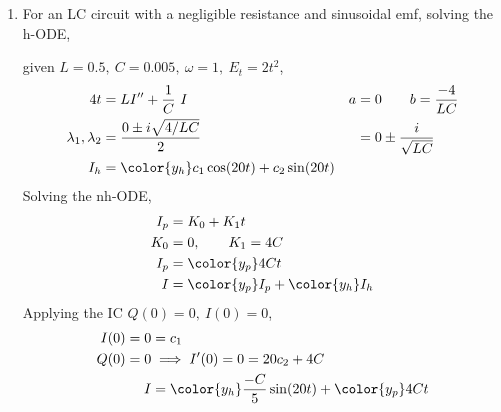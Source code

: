 \begin{enumerate}
    \item For an LC circuit with a negligible resistance and sinusoidal emf, solving
          the h-ODE, \par
          given $ L = 0.5,\ C = 0.005,\ \omega = 1,\ E_{t} = 2t^{2}$,
          \begin{align}
              4t                       & = LI'' + \frac{1}{C}\ I        &
              a                        & = 0 \qquad b = \frac{-4}{LC}     \\
              \lambda_{1}, \lambda_{2} & = \frac{0 \pm i\sqrt{4/LC}}{2} &
                                       & = 0 \pm \frac{i}{\sqrt{LC}}      \\
              I_{h}                    & = {\color{y_h} c_{1}\cos(20 t)
              + c_{2}\sin(20 t)}
          \end{align}
          Solving the nh-ODE,
          \begin{align}
              I_{p} & = K_{0} + K_{1}t                          \\
              K_{0} & = 0, \qquad K_{1} = 4C                    \\
              I_{p} & = {\color{y_p} 4Ct}                       \\
              I     & ={\color{y_p} I_{p}} + {\color{y_h}I_{h}}
          \end{align}
          Applying the IC $ Q(0) = 0,\ I(0) = 0 $,
          \begin{align}
              I(0) = 0 & = c_{1}                                                   \\
              Q(0) = 0 & \implies I'(0) = 0 = 20c_{2} + 4C                         \\
              I        & = {\color{y_h} \frac{-C}{5}\sin(20t)} + {\color{y_p} 4Ct}
          \end{align}
          \begin{figure}[H]
              \centering
          \end{figure}


\end{enumerate}
